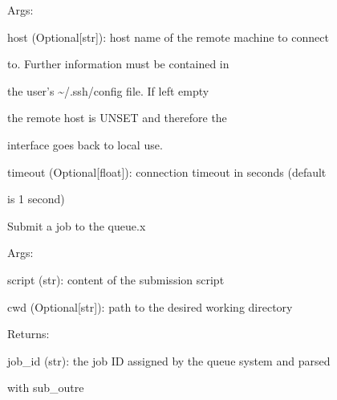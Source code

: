 \documentclass[letterpaper,10pt,english]{sphinxmanual}
\begin{document}
\begin{fulllineitems}
\begin{fulllineitems}
\begin{DUlineblock}{0em}
\item[] Args:
\item[]
\begin{DUlineblock}{\DUlineblockindent}
\item[] host (Optional{[}str{]}): host name of the remote machine to connect
\item[]
\begin{DUlineblock}{\DUlineblockindent}
\item[] to. Further information must be contained in
\item[] the user's \textasciitilde{}/.ssh/config file. If left empty
\item[] the remote host is UNSET and therefore the
\item[] interface goes back to local use.
\end{DUlineblock}
\item[] timeout (Optional{[}float{]}): connection timeout in seconds (default
\item[]
\begin{DUlineblock}{\DUlineblockindent}
\item[] is 1 second)
\end{DUlineblock}
\end{DUlineblock}
\end{DUlineblock}

\end{fulllineitems}


\begin{fulllineitems}
\label{doctree/soprano.hpc.submitter.queues:soprano.hpc.submitter.queues.QueueInterface.submit}
Submit a job to the queue.x

\begin{DUlineblock}{0em}
\item[] Args:
\item[]
\begin{DUlineblock}{\DUlineblockindent}
\item[] script (str): content of the submission script
\item[] cwd (Optional{[}str{]}): path to the desired working directory
\item[] 
\end{DUlineblock}
\item[] Returns:
\item[]
\begin{DUlineblock}{\DUlineblockindent}
\item[] job\_id (str): the job ID assigned by the queue system and parsed
\item[]
\begin{DUlineblock}{\DUlineblockindent}
\item[] with sub\_outre
\end{DUlineblock}
\end{DUlineblock}
\end{DUlineblock}


\end{fulllineitems}
\end{fulllineitems}
\end{document}
